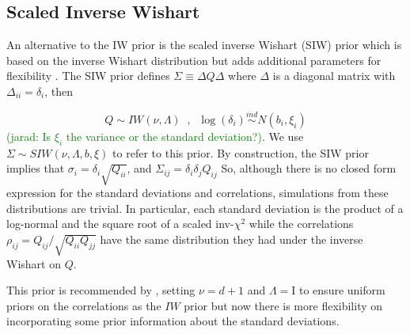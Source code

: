 \documentclass[a4paper]{article}
\newcommand{\jarad}[1]{\textcolor{green}{(jarad: #1)}}
\newcommand{\I}{\mathrm{I}}
\begin{document}
\subsection{Scaled Inverse Wishart \label{sec:siw}}

An alternative to the IW prior is the scaled inverse Wishart (SIW) prior which is based on the inverse Wishart distribution but adds additional parameters for flexibility \citep{odomain}. The SIW prior defines $\Sigma \equiv \Delta Q \Delta $ where $\Delta$ is a diagonal matrix with $\Delta_{ii}=\delta_i$, then 

\begin{equation}
Q \sim  IW(\nu, \Lambda) \;\;, \;\; \log(\delta_i) \stackrel{ind} \sim N(b_i, \xi_i)
\label{eq:siw}
\end{equation} 
\jarad{Is $\xi_i$ the variance or the standard deviation?}.
We use $\Sigma \sim SIW(\nu, \Lambda, b, \xi)$ to refer to this prior.  By construction, the SIW prior implies that $\sigma_i = \delta_i \sqrt{Q_{ii}}$, and $\Sigma_{ij}=\delta_i\delta_jQ_{ij}$ So, although there is no closed form expression for the standard deviations and correlations, simulations from these distributions are trivial. In particular, each standard deviation is the product of a log-normal and the square root of a scaled inv-$\chi^2$ while the correlations $\rho_{ij} = Q_{ij}/\sqrt{Q_{ii}Q_{jj}}$ have the same distribution they had under the inverse Wishart on $Q$.  


This prior is recommended by \cite{gelmanhill}, setting $\nu=d+1$ and $\Lambda=\I$ to ensure uniform priors on the correlations as the $IW$ prior but now there is more flexibility on incorporating some prior information about the standard deviations.
\end{document}
